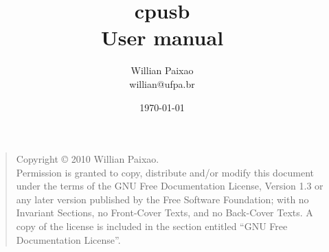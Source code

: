 \documentclass[a4paper,12pt]{book}
\title{cpusb\\User manual}
\author{Willian Paixao\\willian@ufpa.br}
\date{\today}
\begin{document}
        \maketitle

        \begin{quote}
            Copyright \copyright{}  2010  Willian Paixao.\\
            Permission is granted to copy, distribute and/or modify this document
            under the terms of the GNU Free Documentation License, Version 1.3
            or any later version published by the Free Software Foundation;
            with no Invariant Sections, no Front-Cover Texts, and no Back-Cover Texts.
            A copy of the license is included in the section entitled ``GNU
            Free Documentation License''.
        \end{quote}
        \bigskip
        \newpage

        \tableofcontents
        \newpage
\end{document}
